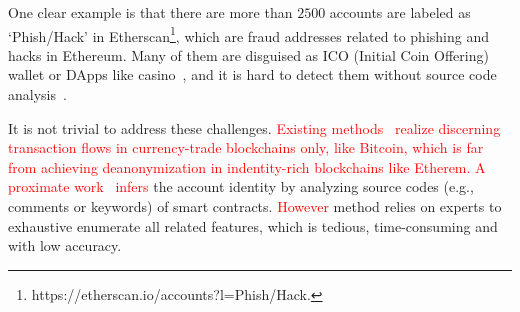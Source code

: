 One clear example is that there are more than $2500$ accounts are labeled as `Phish/Hack' in Etherscan\footnote{https://etherscan.io/accounts?l=Phish/Hack.}, which are fraud addresses related to phishing and hacks in Ethereum. Many of them are disguised as ICO (Initial Coin Offering) wallet or DApps like casino~\cite{cerchiello2018icos}, and it is hard to detect them without source code analysis~\cite{jiang2018contractfuzzer}. 

It is not trivial to address these challenges. \textcolor{red}{Existing methods~\cite{maesa2016analysis,ranshous2017exchange,zhao2015graph} realize discerning transaction flows in currency-trade blockchains only, like Bitcoin, which is far from achieving deanonymization in indentity-rich blockchains like Etherem.}
\textcolor{red}{A proximate work~\cite{chen2018infocom} infers} the account identity by analyzing source codes (e.g., comments or keywords) of smart contracts. \textcolor{red}{However} method relies on experts to exhaustive enumerate all related features, which is tedious, time-consuming and with low accuracy.




